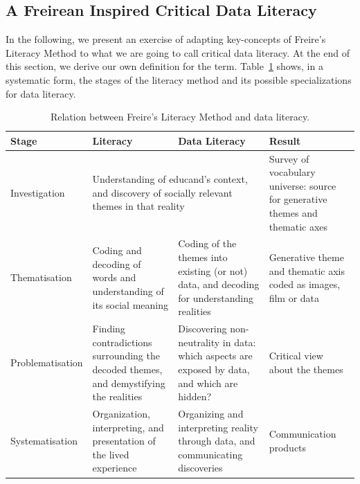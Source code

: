\subsection{A Freirean Inspired Critical Data Literacy}
\label{sec:freirean_dl}
In the following, we present an exercise of adapting key-concepts of Freire's Literacy Method to what we are going to call critical data literacy. At the end of this section, we derive our own definition for the term. Table~\ref{tab:freire_dataliteracy} shows, in a systematic form, the stages of the literacy method and its possible specializations for data literacy.

\begin{table}[h]
\ABNTEXfontereduzida
\centering
\caption{Relation between Freire's Literacy Method and data literacy.}
\label{tab:freire_dataliteracy}
\begin{tabular}{|p{2.5cm}|p{3.6cm}|p{3.6cm}|p{3.6cm}|}
\hline
\textbf{Stage}   & \textbf{Literacy} & \textbf{Data Literacy} & \textbf{Result} \\ \hline
Investigation&
\multicolumn{2}{p{7.2cm}|}{Understanding of educand's context, and discovery of socially relevant themes in that reality}
&Survey of vocabulary universe: source for generative themes and thematic axes \\ \hline

Thematisation&Coding and decoding of words and understanding of its social meaning&Coding of the themes into existing (or not) data, and decoding for understanding realities&Generative theme and thematic axis coded as images, film or data \\ \hline

Problematisation&Finding contradictions surrounding the decoded themes, and demystifying the realities&Discovering non-neutrality in data: which aspects are exposed by data, and which are hidden?&Critical view about the themes \\ \hline

Systematisation&Organization, interpreting, and presentation of the lived experience&Organizing and interpreting reality through data, and communicating discoveries&Communication products \\ \hline

\end{tabular}
\end{table}

